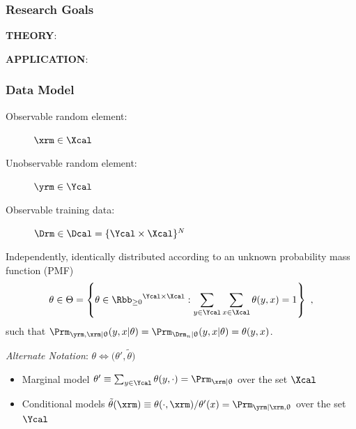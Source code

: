 \documentclass[aspectratio=169,usenames,dvipsnames]{beamer}
\begin{document}
\begin{frame}
\frametitle{Research Goals}

\textbf{THEORY}:

\vspace{1em}
{}

\vspace{2em}

\textbf{APPLICATION}:

\vspace{1em}
\centering
{}

\end{frame}



\begin{frame}
\frametitle{Data Model}

\begin{description}
\item[Observable random element:] $\xrm \in \Xcal$
\item[Unobservable random element:] $\yrm \in \Ycal$
\item[Observable training data:] $\Drm \in \Dcal = \{\Ycal \times \Xcal\}^N$
\end{description}

\vspace{0.5em}

Independently, identically distributed according to an \alert{unknown} probability mass function (PMF) 
\begin{equation*}
\theta \in \Theta = \left\{ \theta \in {\Rbb_{\geq 0}}^{\Ycal \times \Xcal}: \sum_{y \in \Ycal} \sum_{x \in \Xcal} \theta(y,x) = 1 \right\} \ ,
\end{equation*}
such that $\Prm_{\yrm,\xrm | \uptheta}(y,x | \theta) = \Prm_{\Drm_n | \uptheta}(y,x | \theta) = \theta(y,x)$.

\hrulefill

\vspace{0.5em}
\textit{Alternate Notation}: $\theta \Leftrightarrow \big( \theta',\tilde{\theta} \big)$
\begin{itemize}
\item Marginal model $\theta' \equiv \sum_{y \in \Ycal} \theta(y,\cdot) = \Prm_{\xrm | \uptheta}$ over the set $\Xcal$ 
\item Conditional models $\tilde{\theta}(\xrm) \equiv \theta(\cdot,\xrm) / \theta'(x) = \Prm_{\yrm | \xrm,\uptheta}$ over the set $\Ycal$
\end{itemize}

\end{frame}
\end{document}
